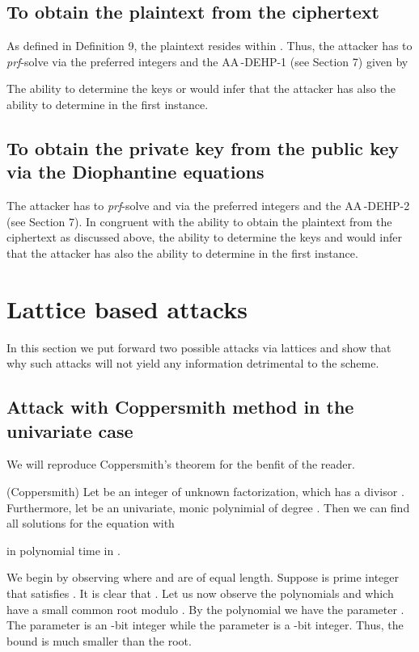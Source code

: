 \documentclass{llncs}
\begin{document}
\subsection{To obtain the plaintext from the ciphertext}
As defined in Definition 9, the plaintext resides within .
Thus, the attacker has to \textit{prf}-solve  via the preferred
integers  and  the AA\,-DEHP-1 (see
Section 7) given by

The ability to determine the keys  or  would infer
that the attacker has also the ability to determine  in the
first instance.

\subsection{To obtain the private key from the public key via the Diophantine equations}
The attacker has to \textit{prf}-solve  and  via
the preferred integers  and  the
AA\,-DEHP-2 (see Section 7). In congruent with the
ability to obtain the plaintext from the ciphertext as discussed
above, the ability to determine the keys  and
 would infer that the attacker has also the ability to
determine  in the first instance.

\section{Lattice based attacks}
In this section we put forward two possible attacks via lattices
and show that why such attacks will not yield any information
detrimental to the scheme.

\subsection{Attack with Coppersmith method in the univariate case}
We will reproduce Coppersmith's theorem for the benfit of the
reader.

\begin{theorem}(Coppersmith)
Let  be an integer of unknown factorization, which has a
divisor . Furthermore, let  be an
univariate, monic polynimial of degree . Then we can find
all solutions  for the equation  with

in polynomial time in .
\end{theorem}

\begin{case}
We begin by observing  where  and  are of equal
length. Suppose  is prime integer that satisfies
. It is clear that . Let us now
observe the polynomials  and  which have a
small common root  modulo . By the polynomial
 we have the parameter .
The parameter  is an -bit integer while the parameter
 is a -bit integer. Thus, the bound is much smaller
than the root.
\end{case}
\end{document}

